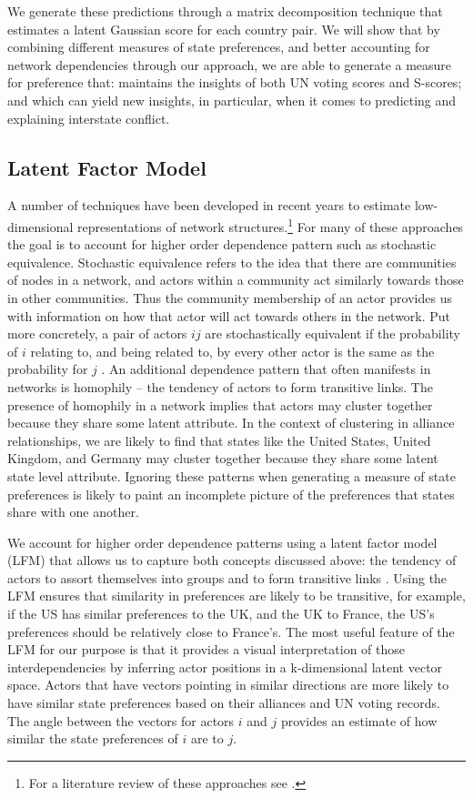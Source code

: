 We generate these predictions through a matrix decomposition technique that estimates a latent Gaussian score for each country pair. We will show that by combining different measures of state preferences, and better accounting for network dependencies through our approach, we are able to generate a measure for preference that: maintains the insights of both UN voting scores and S-scores; and which can yield new insights, in particular, when it comes to predicting and explaining interstate conflict.

\subsection*{Latent Factor Model}

A number of techniques have been developed in recent years to estimate low-dimensional representations of network structures.\footnote{For a literature review of these approaches see \citet{goldenberg:etal:2010}.} For many of these approaches the goal is to account for higher order dependence pattern such as stochastic equivalence. Stochastic equivalence refers to the idea that there are communities of nodes in a network, and actors within a community act similarly towards those in other communities. Thus the community membership of an actor provides us with information on how that actor will act towards others in the network. Put more concretely, a pair of actors $ij$ are stochastically equivalent if the probability of $i$ relating to, and being related to, by every other actor is the same as the probability for $j$ \citep{anderson:etal:1992}. An additional dependence pattern that often manifests in networks is homophily -- the tendency of actors to form transitive links. The presence of homophily in a network implies that actors may cluster together because they share some latent attribute. In the context of clustering in alliance relationships, we are likely to find that states like the United States, United Kingdom, and Germany may cluster together because they share some latent state level attribute. Ignoring these patterns when generating a measure of state preferences is likely to paint an incomplete picture of the preferences that states share with one another.

We account for higher order dependence patterns using a latent factor model (LFM) that allows us to capture both concepts discussed above: the tendency of actors to assort themselves into groups and to form transitive links \citep{hoff:2007,minhas:etal:2016:arxiv}. Using the LFM ensures that similarity in preferences are likely to be transitive, for example, if the US has similar preferences to the UK, and the UK to France, the US's preferences should be relatively close to France's. The most useful feature of the LFM for our purpose is that it provides a visual interpretation of those interdependencies by inferring actor positions in a k-dimensional latent vector space. Actors that have vectors pointing in similar directions are more likely to have similar state preferences based on their alliances and UN voting records. The angle between the vectors for actors $i$ and $j$ provides an estimate of how similar the state preferences of $i$ are to $j$. 

